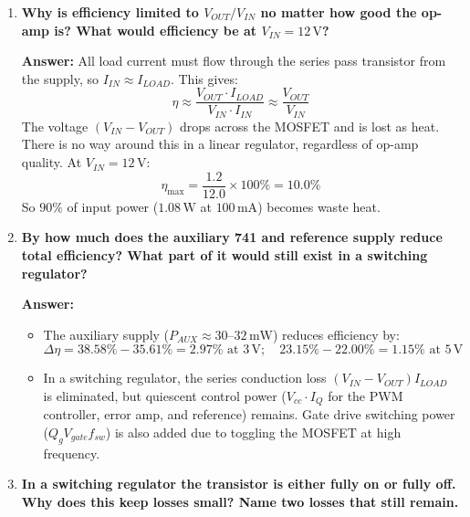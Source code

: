 \documentclass[11pt,a4paper]{article}
\begin{document}
\begin{enumerate}[label=\textbf{Q\arabic*.}, leftmargin=2.0em, itemsep=0.8em]
    \item \textbf{Why is efficiency limited to $V_{OUT}/V_{IN}$ no matter how good the op-amp is? What would efficiency be at $V_{IN} = 12\,\text{V}$?}

    \textbf{Answer:} All load current must flow through the series pass transistor from the supply, so $I_{IN} \approx I_{LOAD}$. This gives:
    \begin{equation}
        \eta \approx \frac{V_{OUT} \cdot I_{LOAD}}{V_{IN} \cdot I_{IN}} \approx \frac{V_{OUT}}{V_{IN}}
    \end{equation}
    The voltage $(V_{IN} - V_{OUT})$ drops across the MOSFET and is lost as heat. There is no way around this in a linear regulator, regardless of op-amp quality. At $V_{IN} = 12\,\text{V}$:
    \begin{equation}
        \eta_{\max} = \frac{1.2}{12.0} \times 100\% = \mathbf{10.0\%}
    \end{equation}
    So $90\%$ of input power ($1.08\,\text{W}$ at $100\,\text{mA}$) becomes waste heat.

    \item \textbf{By how much does the auxiliary 741 and reference supply reduce total efficiency? What part of it would still exist in a switching regulator?}

    \textbf{Answer:}
    \begin{itemize}[leftmargin=1.2em, itemsep=0.1em]
        \item The auxiliary supply ($P_{AUX} \approx 30\text{--}32\,\text{mW}$) reduces efficiency by:
        \begin{equation}
            \Delta\eta = 38.58\% - 35.61\% = \mathbf{2.97\%} \text{ at } 3\,\text{V}; \quad 23.15\% - 22.00\% = \mathbf{1.15\%} \text{ at } 5\,\text{V}
        \end{equation}
        \item In a switching regulator, the series conduction loss $(V_{IN}-V_{OUT})I_{LOAD}$ is eliminated, but quiescent control power ($V_{cc} \cdot I_Q$ for the PWM controller, error amp, and reference) remains. Gate drive switching power ($Q_g V_{gate} f_{sw}$) is also added due to toggling the MOSFET at high frequency.
    \end{itemize}

    \item \textbf{In a switching regulator the transistor is either fully on or fully off. Why does this keep losses small? Name two losses that still remain.}


\end{enumerate}
\end{document}
